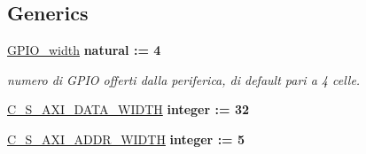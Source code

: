 \subsection*{Generics}
 \begin{DoxyCompactItemize}
\item 
\hypertarget{classmy_g_p_i_o___a_x_i_ga0b52ca75e9a6093b2b60d5e851803069}{\hyperlink{group___a_x_i-internal_ga0b52ca75e9a6093b2b60d5e851803069}{G\+P\+I\+O\+\_\+width} {\bfseries {\bfseries \textcolor{vhdlchar}{natural}\textcolor{vhdlchar}{ }\textcolor{vhdlchar}{ }\textcolor{vhdlchar}{\+:}\textcolor{vhdlchar}{=}\textcolor{vhdlchar}{ }\textcolor{vhdlchar}{ } \textcolor{vhdldigit}{4} \textcolor{vhdlchar}{ }}}}\label{classmy_g_p_i_o___a_x_i_ga0b52ca75e9a6093b2b60d5e851803069}

\begin{DoxyCompactList}\small\item\em numero di G\+P\+I\+O offerti dalla periferica, di default pari a 4 celle. \end{DoxyCompactList}\item 
\hypertarget{classmy_g_p_i_o___a_x_i_ga0fad312acd1f302ce7de30c5658df0bd}{\hyperlink{group___a_x_i-internal_ga0fad312acd1f302ce7de30c5658df0bd}{C\+\_\+\+S\+\_\+\+A\+X\+I\+\_\+\+D\+A\+T\+A\+\_\+\+W\+I\+D\+T\+H} {\bfseries {\bfseries \textcolor{vhdlchar}{integer}\textcolor{vhdlchar}{ }\textcolor{vhdlchar}{ }\textcolor{vhdlchar}{\+:}\textcolor{vhdlchar}{=}\textcolor{vhdlchar}{ }\textcolor{vhdlchar}{ } \textcolor{vhdldigit}{32} \textcolor{vhdlchar}{ }}}}\label{classmy_g_p_i_o___a_x_i_ga0fad312acd1f302ce7de30c5658df0bd}

\item 
\hypertarget{classmy_g_p_i_o___a_x_i_ga9abff2eaa069440f3b7d9e9937d5ee8e}{\hyperlink{group___a_x_i-internal_ga9abff2eaa069440f3b7d9e9937d5ee8e}{C\+\_\+\+S\+\_\+\+A\+X\+I\+\_\+\+A\+D\+D\+R\+\_\+\+W\+I\+D\+T\+H} {\bfseries {\bfseries \textcolor{vhdlchar}{integer}\textcolor{vhdlchar}{ }\textcolor{vhdlchar}{ }\textcolor{vhdlchar}{\+:}\textcolor{vhdlchar}{=}\textcolor{vhdlchar}{ }\textcolor{vhdlchar}{ } \textcolor{vhdldigit}{5} \textcolor{vhdlchar}{ }}}}\label{classmy_g_p_i_o___a_x_i_ga9abff2eaa069440f3b7d9e9937d5ee8e}

\end{DoxyCompactItemize}
